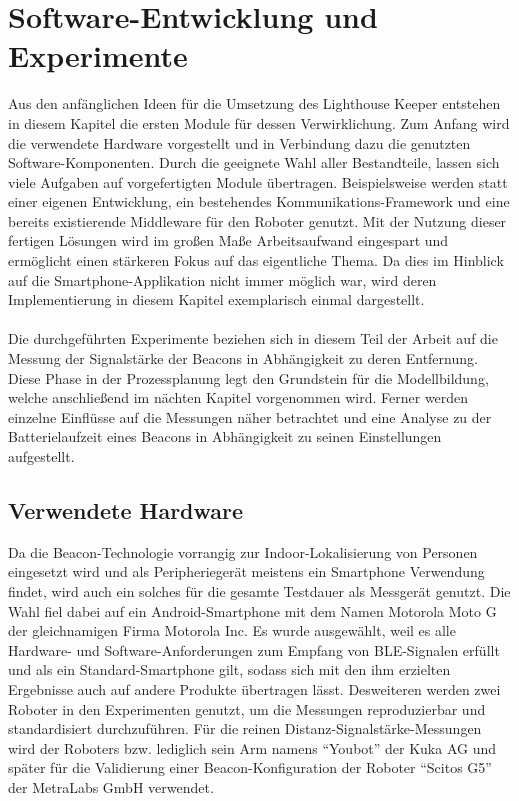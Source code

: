 \chapter{Software-Entwicklung und Experimente}
Aus den anfänglichen Ideen für die Umsetzung des Lighthouse Keeper entstehen in diesem Kapitel die ersten Module für dessen Verwirklichung. Zum Anfang wird die verwendete Hardware vorgestellt und in Verbindung dazu die genutzten Software-Komponenten. Durch die geeignete Wahl aller Bestandteile, lassen sich viele Aufgaben auf vorgefertigten Module übertragen. Beispielsweise werden statt einer eigenen Entwicklung, ein bestehendes Kommunikations-Framework und eine bereits existierende Middleware für den Roboter genutzt. Mit der Nutzung dieser fertigen Lösungen wird im großen Maße Arbeitsaufwand eingespart und ermöglicht einen stärkeren Fokus auf das eigentliche Thema. Da dies im Hinblick auf die Smartphone-Applikation nicht immer möglich war, wird deren Implementierung in diesem Kapitel exemplarisch einmal dargestellt. \\ \\
Die durchgeführten Experimente beziehen sich in diesem Teil der Arbeit auf die Messung der Signalstärke der Beacons in Abhängigkeit zu deren Entfernung. Diese Phase in der Prozessplanung legt den Grundstein für die Modellbildung, welche anschließend im nächten Kapitel vorgenommen wird. Ferner werden einzelne Einflüsse auf die Messungen näher betrachtet und eine Analyse zu der Batterielaufzeit eines Beacons in Abhängigkeit zu seinen Einstellungen aufgestellt.
\section{Verwendete Hardware}
Da die Beacon-Technologie vorrangig zur Indoor-Lokalisierung von Personen eingesetzt wird und als Peripheriegerät meistens ein Smartphone Verwendung findet, wird auch ein solches für die gesamte Testdauer als Messgerät genutzt. Die Wahl fiel dabei auf ein Android-Smartphone mit dem Namen Motorola Moto G der gleichnamigen Firma Motorola Inc. Es wurde ausgewählt, weil es alle Hardware- und Software-Anforderungen zum Empfang von BLE-Signalen erfüllt und als ein Standard-Smartphone gilt, sodass sich mit den ihm erzielten Ergebnisse auch auf andere Produkte übertragen lässt. Desweiteren werden zwei Roboter in den Experimenten genutzt, um die Messungen reproduzierbar und standardisiert durchzuführen. Für die reinen Distanz-Signalstärke-Messungen wird der Roboters bzw. lediglich sein Arm namens "`Youbot"' der Kuka AG und später für die Validierung einer Beacon-Konfiguration der Roboter "`Scitos G5"' der MetraLabs GmbH verwendet. 
